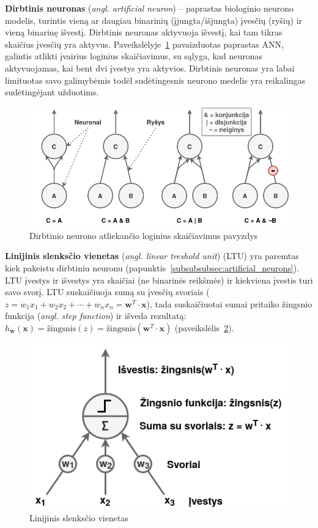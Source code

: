 \documentclass{VUMIFPSbakalaurinis}
\begin{document}
\label{subsubsubsec:artificial_neurons}
{
	\textbf{Dirbtinis neuronas} (\textit{angl. artificial neuron}) -- paprastas biologinio neurono modelis, turintis vieną ar daugiau binarinių (įjungta/išjungta) įvesčių (ryšių) ir vieną binarinę išvestį. Dirbtinis neuronas aktyvuoja išvestį, kai tam tikras skaičius įvesčių yra aktyvus. Paveikslėlyje~\ref{img:artificial_neurons} pavaizduotas paprastas ANN, galintis atlikti įvairius loginius skaičiavimus, su sąlyga, kad neuronas aktyvuojamas, kai bent dvi įvestys yra aktyvios. Dirbtinis neuronas yra labai limituotas savo galimybėmis todėl sudėtingesnis neurono medelis yra reikalingas sudėtingėjant užduotims. 
	
	\begin{figure}[H]
		\centering
		\includegraphics[scale=0.33]{img/artificial_neurons}
		\caption{Dirbtinio neurono atliekančio loginius skaičiavimus pavyzdys}
		\label{img:artificial_neurons}
	\end{figure} 
}
\label{subsubsubsec:ltu}
{
	\textbf{Linijinis slenksčio vienetas} (\textit{angl. linear treshold unit}) (LTU) yra paremtas kiek pakeistu dirbtiniu neuronu (papunktis~\ref{subsubsubsec:artificial_neurons}). LTU įvestys ir išvestys yra skaičiai (ne binarinės reikšmės) ir kiekviena įvestis turi savo svorį. LTU suskaičiuoja sumą su įvesčių svoriais (\(z = w_1 x_1 + w_2 x_2 + \cdots + w_n x_n = \mathbf{w}^T \cdot \mathbf{x} \)), tada suskaičiuotai sumai pritaiko žingsnio funkcija (\textit{angl. step function}) ir išveda rezultatą: \(h_\mathbf{w}(\mathbf{x}) = \textrm{žingsnis}(z) = \textrm{žingsnis}(\mathbf{w}^T \cdot \mathbf{x})\) (paveikslėlis~\ref{img:ltu}).
	
	\begin{figure}[H]
		\centering
		\includegraphics[scale=0.33]{img/ltu}
		\caption{Linijinis slenksčio vienetas}
		\label{img:ltu}
	\end{figure} 
}
\end{document}
